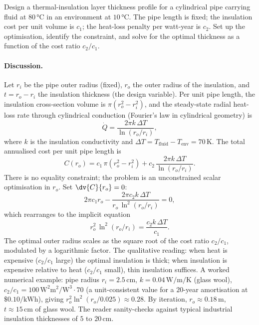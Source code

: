 \begin{exercise}
Design a thermal-insulation layer thickness profile for a cylindrical
pipe carrying fluid at $80\,\si{\degreeCelsius}$ in an environment
at $10\,\si{\degreeCelsius}$. The pipe length is fixed; the
insulation cost per unit volume is $c_{1}$; the heat-loss penalty
per watt-year is $c_{2}$. Set up the optimisation, identify the
constraint, and solve for the optimal thickness as a function of
the cost ratio $c_{2}/c_{1}$.

\paragraph{Discussion.} Let $r_{i}$ be the pipe outer radius (fixed),
$r_{o}$ the outer radius of the insulation, and $t = r_{o} - r_{i}$
the insulation thickness (the design variable). Per unit pipe
length, the insulation cross-section volume is $\pi(r_{o}^{2} -
r_{i}^{2})$, and the steady-state radial heat-loss rate through
cylindrical conduction (Fourier's law in cylindrical geometry) is
\[
\dot{Q} = \frac{2\pi k\,\Delta T}{\ln(r_{o}/r_{i})},
\]
where $k$ is the insulation conductivity and $\Delta T = T_{\text{
fluid}} - T_{\text{env}} = 70\,\si{\kelvin}$. The total annualised
cost per unit pipe length is
\[
C(r_{o}) = c_{1}\,\pi(r_{o}^{2} - r_{i}^{2}) + c_{2}\,
\frac{2\pi k\,\Delta T}{\ln(r_{o}/r_{i})}.
\]
There is no equality constraint; the problem is an unconstrained
scalar optimisation in $r_{o}$. Set $\dv{C}{r_{o}} = 0$:
\[
2 \pi c_{1} r_{o} - \frac{2\pi c_{2} k\,\Delta T}{r_{o}\,\ln^{2}
(r_{o}/r_{i})} = 0,
\]
which rearranges to the implicit equation
\[
r_{o}^{2}\,\ln^{2}(r_{o}/r_{i}) = \frac{c_{2} k\,\Delta T}{c_{1}}.
\]
The optimal outer radius scales as the square root of the cost
ratio $c_{2}/c_{1}$, modulated by a logarithmic factor. The
qualitative reading: when heat is expensive ($c_{2}/c_{1}$ large)
the optimal insulation is thick; when insulation is expensive
relative to heat ($c_{2}/c_{1}$ small), thin insulation suffices.
A worked numerical example: pipe radius $r_{i} =
2.5\,\si{\centi\meter}$, $k = 0.04\,\si{\watt\per\meter\per\kelvin}$
(glass wool), $c_{2}/c_{1} = 100\,\si{\watt\squared\meter\squared
\per\watt\cubed} \cdot 70$ (a unit-consistent value for a $20$-year
amortisation at $\$0.10/\si{\kilo\watt\hour}$), giving $r_{o}^{2}
\ln^{2}(r_{o}/0.025) \approx 0.28$. By iteration, $r_{o} \approx
0.18\,\si{\meter}$, $t \approx 15\,\si{\centi\meter}$ of glass
wool. The reader sanity-checks against typical industrial insulation
thicknesses of $5$ to $20\,\si{\centi\meter}$.


\end{exercise}
